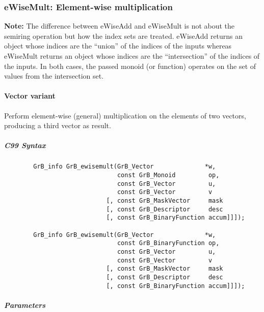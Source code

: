 \subsubsection{{\sf eWiseMult}: Element-wise multiplication}

{\bf Note:} The difference between {\sf eWiseAdd} and {\sf eWiseMult} is not 
about the semiring operation but how the index sets are treated.
{\sf eWiseAdd} returns an object whose indices are the ``union'' of the 
indices of the inputs whereas {\sf eWiseMult} returns an object whose indices 
are the ``intersection'' of the indices of the inputs. In both cases, the 
passed monoid (or function) operates on the set of values from the 
intersection set. 
 
\paragraph{Vector variant}

Perform element-wise (general) multiplication on the elements of two vectors,
producing a third vector as result.

\subparagraph{C99 Syntax}

\begin{verbatim}
        GrB_info GrB_ewisemult(GrB_Vector              *w,
                               const GrB_Monoid         op, 
                               const GrB_Vector         u,
                               const GrB_Vector         v
                            [, const GrB_MaskVector     mask
                            [, const GrB_Descriptor     desc
                            [, const GrB_BinaryFunction accum]]]);
                            
        GrB_info GrB_ewisemult(GrB_Vector              *w,
                               const GrB_BinaryFunction op, 
                               const GrB_Vector         u,
                               const GrB_Vector         v
                            [, const GrB_MaskVector     mask
                            [, const GrB_Descriptor     desc
                            [, const GrB_BinaryFunction accum]]]);
\end{verbatim}

\subparagraph{Parameters}

